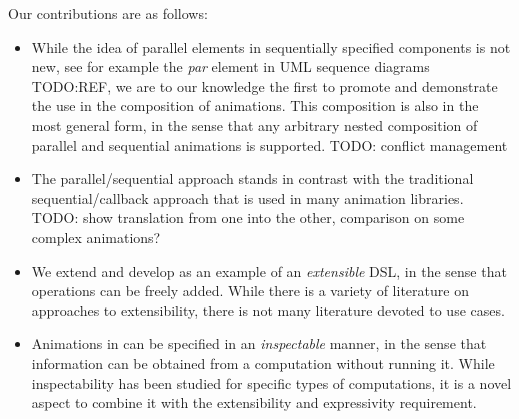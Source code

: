 Our contributions are as follows:
\begin{itemize}
\item While the idea of parallel elements in sequentially specified components is not new, see for example the \emph{par} element in UML sequence diagrams TODO:REF, we are to our knowledge the first to promote and demonstrate the use in the composition of animations. This composition is also in the most general form, in the sense that any arbitrary nested composition of parallel and sequential animations is supported. TODO: conflict management
\item The parallel/sequential approach stands in contrast with the traditional sequential/callback approach that is used in many animation libraries. TODO: show translation from one into the other, comparison on some complex animations?
\item We extend and develop \dsl{} as an example of an \emph{extensible} DSL, in the sense that operations can be freely added. While there is a variety of literature on approaches to extensibility, there is not many literature devoted to use cases.
\item Animations in \dsl{} can be specified in an \emph{inspectable} manner, in the sense that information can be obtained from a computation without running it. While inspectability has been studied for specific types of computations, it is a novel aspect to combine it with the extensibility and expressivity requirement.
\end{itemize}
